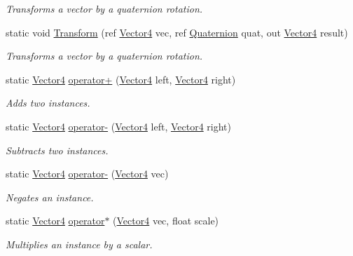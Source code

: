 \begin{DoxyCompactItemize}
\begin{DoxyCompactList}\small\item\em Transforms a vector by a quaternion rotation. \end{DoxyCompactList}\item 
static void \hyperlink{struct_open_t_k_1_1_vector4_a28b0e8c46096709783ffcffc5ec51a26}{Transform} (ref \hyperlink{struct_open_t_k_1_1_vector4}{Vector4} vec, ref \hyperlink{struct_open_t_k_1_1_quaternion}{Quaternion} quat, out \hyperlink{struct_open_t_k_1_1_vector4}{Vector4} result)
\begin{DoxyCompactList}\small\item\em Transforms a vector by a quaternion rotation. \end{DoxyCompactList}\item 
static \hyperlink{struct_open_t_k_1_1_vector4}{Vector4} \hyperlink{struct_open_t_k_1_1_vector4_af18af1cc92daa6d82ced9873bda29e32}{operator+} (\hyperlink{struct_open_t_k_1_1_vector4}{Vector4} left, \hyperlink{struct_open_t_k_1_1_vector4}{Vector4} right)
\begin{DoxyCompactList}\small\item\em Adds two instances. \end{DoxyCompactList}\item 
static \hyperlink{struct_open_t_k_1_1_vector4}{Vector4} \hyperlink{struct_open_t_k_1_1_vector4_a900d0251c6dd011b8b4c925f936ab339}{operator-\/} (\hyperlink{struct_open_t_k_1_1_vector4}{Vector4} left, \hyperlink{struct_open_t_k_1_1_vector4}{Vector4} right)
\begin{DoxyCompactList}\small\item\em Subtracts two instances. \end{DoxyCompactList}\item 
static \hyperlink{struct_open_t_k_1_1_vector4}{Vector4} \hyperlink{struct_open_t_k_1_1_vector4_a86dfa78e2e67cc6ec0b3f4396ff31395}{operator-\/} (\hyperlink{struct_open_t_k_1_1_vector4}{Vector4} vec)
\begin{DoxyCompactList}\small\item\em Negates an instance. \end{DoxyCompactList}\item 
static \hyperlink{struct_open_t_k_1_1_vector4}{Vector4} \hyperlink{struct_open_t_k_1_1_vector4_a1c8b35d5622d0f3c41788027cb26ed8b}{operator$\ast$} (\hyperlink{struct_open_t_k_1_1_vector4}{Vector4} vec, float scale)
\begin{DoxyCompactList}\small\item\em Multiplies an instance by a scalar. \end{DoxyCompactList}\item 

\end{DoxyCompactItemize}
